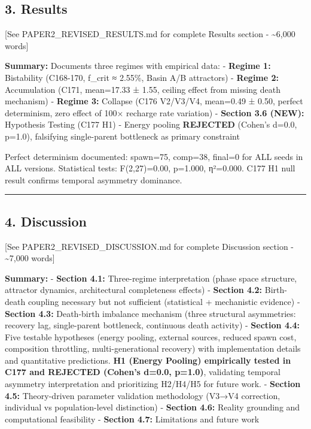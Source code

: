 \documentclass[
]{article}
\begin{document}
\subsection{3. Results}\label{results}

{[}See PAPER2\_REVISED\_RESULTS.md for complete Results section -
\textasciitilde6,000 words{]}

\textbf{Summary:} Documents three regimes with empirical data: -
\textbf{Regime 1:} Bistability (C168-170, f\_crit ≈ 2.55\%, Basin A/B
attractors) - \textbf{Regime 2:} Accumulation (C171, mean=17.33 ± 1.55,
ceiling effect from missing death mechanism) - \textbf{Regime 3:}
Collapse (C176 V2/V3/V4, mean=0.49 ± 0.50, perfect determinism, zero
effect of 100× recharge rate variation) - \textbf{Section 3.6 (NEW):}
Hypothesis Testing (C177 H1) - Energy pooling \textbf{REJECTED} (Cohen's
d=0.0, p=1.0), falsifying single-parent bottleneck as primary constraint

Perfect determinism documented: spawn=75, comp=38, final=0 for ALL seeds
in ALL versions. Statistical tests: F(2,27)=0.00, p=1.000, η²=0.000.
C177 H1 null result confirms temporal asymmetry dominance.

\begin{center}\rule{0.5\linewidth}{0.5pt}\end{center}

\subsection{4. Discussion}\label{discussion}

{[}See PAPER2\_REVISED\_DISCUSSION.md for complete Discussion section -
\textasciitilde7,000 words{]}

\textbf{Summary:} - \textbf{Section 4.1:} Three-regime interpretation
(phase space structure, attractor dynamics, architectural completeness
effects) - \textbf{Section 4.2:} Birth-death coupling necessary but not
sufficient (statistical + mechanistic evidence) - \textbf{Section 4.3:}
Death-birth imbalance mechanism (three structural asymmetries: recovery
lag, single-parent bottleneck, continuous death activity) -
\textbf{Section 4.4:} Five testable hypotheses (energy pooling, external
sources, reduced spawn cost, composition throttling, multi-generational
recovery) with implementation details and quantitative predictions.
\textbf{H1 (Energy Pooling) empirically tested in C177 and REJECTED
(Cohen's d=0.0, p=1.0)}, validating temporal asymmetry interpretation
and prioritizing H2/H4/H5 for future work. - \textbf{Section 4.5:}
Theory-driven parameter validation methodology (V3→V4 correction,
individual vs population-level distinction) - \textbf{Section 4.6:}
Reality grounding and computational feasibility - \textbf{Section 4.7:}
Limitations and future work
\end{document}
